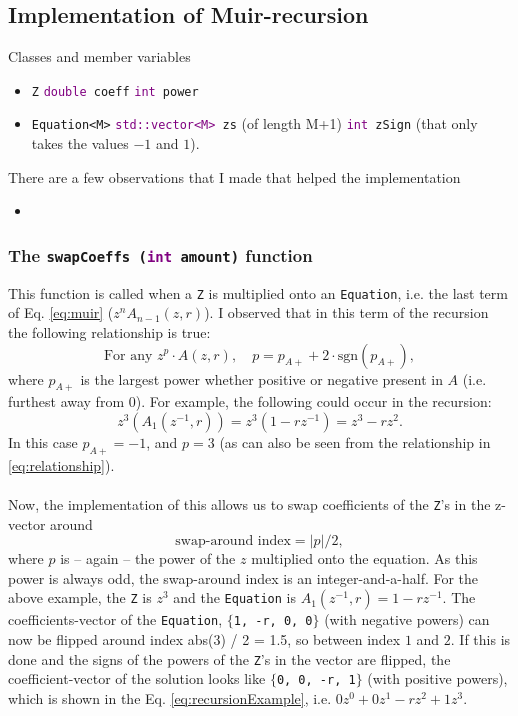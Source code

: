 \documentclass[dvipsnames]{article}
\def\type[#1]{\textcolor{purple}{#1}}
\begin{document}
\subsection{Implementation of Muir-recursion}
Classes and member variables

\begin{itemize}
    \item \texttt{Z}
    \subitem \texttt{\type[double] coeff}
    \subitem \texttt{\type[int] power}
    \item \texttt{Equation\textless M\textgreater}
    \subitem \texttt{\type[std::vector\textless M\textgreater] zs} (of length M+1)
    \subitem \texttt{\type[int] zSign} (that only takes the values $-1$ and $1$).
\end{itemize}

There are a few observations that I made that helped the implementation
\begin{itemize}
    \item 
\end{itemize}

\subsubsection{The \texttt{swapCoeffs (\type[int] amount)} function}
This function is called when a \texttt{Z} is multiplied onto an \texttt{Equation}, i.e. the last term of Eq. \eqref{eq:muir} ($z^nA_{n-1}(z,r)$). I observed that in this term of the recursion the following relationship is true:
\begin{equation}\label{eq:relationship}
    \text{For any } z^p\cdot A(z,r), \quad  p = p_{A+} + 2\cdot\text{sgn}(p_{A+}),
\end{equation}
where $p_{A+}$ is the largest  power whether positive or negative present in $A$ (i.e. furthest away from 0). For example, the following could occur in the recursion:
\begin{equation}\label{eq:recursionExample}
    z^3 (A_1(z^{-1}, r)) = z^3(1 - rz^{-1}) = z^3 - rz^2.
\end{equation}
In this case $p_{A+} = -1$, and $p = 3$ (as can also be seen from the relationship in \eqref{eq:relationship}).
\\
\\
\noindent Now, the implementation of this allows us to swap coefficients of the \texttt{Z}'s in the z-vector around
\begin{equation}
\text{swap-around index} = |p| / 2,
\end{equation}
where $p$ is -- again -- the power of the $z$ multiplied onto the equation. As this power is always odd, the swap-around index is an integer-and-a-half. For the above example, the \texttt{Z} is $z^3$ and the \texttt{Equation} is $A_1(z^{-1},r) = 1-rz^{-1}$. The coefficients-vector of the \texttt{Equation}, \texttt{$\{$1, -r, 0, 0$\}$} (with negative powers) can now be flipped around index abs(3) / 2 = 1.5, so between index $1$ and $2$. If this is done and the signs of the powers of the \texttt{Z}'s in the vector are flipped, the coefficient-vector of the solution looks like \texttt{$\{$0, 0, -r, 1$\}$} (with positive powers), which is shown in the Eq. \eqref{eq:recursionExample}, i.e. $0z^0+0z^1-rz^2+1z^3$.
     
\end{document}
